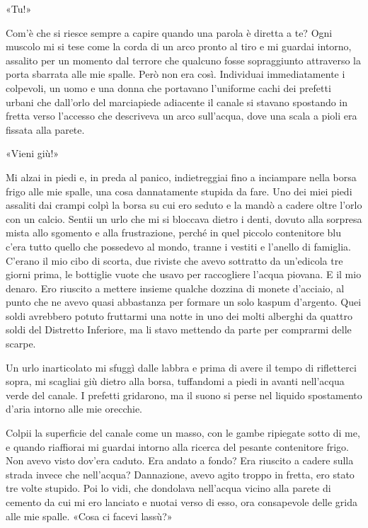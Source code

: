 «Tu!»

Com'è che si riesce sempre a capire quando una parola è diretta a te?
Ogni muscolo mi si tese come la corda di un arco pronto al tiro e mi
guardai intorno, assalito per un momento dal terrore che qualcuno fosse
sopraggiunto attraverso la porta sbarrata alle mie spalle. Però non era
così. Individuai immediatamente i colpevoli, un uomo e una donna che
portavano l'uniforme cachi dei prefetti urbani che dall'orlo del
marciapiede adiacente il canale si stavano spostando in fretta verso
l'accesso che descriveva un arco sull'acqua, dove una scala a pioli era
fissata alla parete.

«Vieni giù!»

Mi alzai in piedi e, in preda al panico, indietreggiai fino a inciampare
nella borsa frigo alle mie spalle, una cosa dannatamente stupida da
fare. Uno dei miei piedi assaliti dai crampi colpì la borsa su cui ero
seduto e la mandò a cadere oltre l'orlo con un calcio. Sentii un urlo
che mi si bloccava dietro i denti, dovuto alla sorpresa mista allo
sgomento e alla frustrazione, perché in quel piccolo contenitore blu
c'era tutto quello che possedevo al mondo, tranne i vestiti e l'anello
di famiglia. C'erano il mio cibo di scorta, due riviste che avevo
sottratto da un'edicola tre giorni prima, le bottiglie vuote che usavo
per raccogliere l'acqua piovana. E il mio denaro. Ero riuscito a mettere
insieme qualche dozzina di monete d'acciaio, al punto che ne avevo quasi
abbastanza per formare un solo kaspum d'argento. Quei soldi avrebbero
potuto fruttarmi una notte in uno dei molti alberghi da quattro soldi
del Distretto Inferiore, ma li stavo mettendo da parte per comprarmi
delle scarpe.

Un urlo inarticolato mi sfuggì dalle labbra e prima di avere il tempo di
rifletterci sopra, mi scagliai giù dietro alla borsa, tuffandomi a piedi
in avanti nell'acqua verde del canale. I prefetti gridarono, ma il suono
si perse nel liquido spostamento d'aria intorno alle mie orecchie.

Colpii la superficie del canale come un masso, con le gambe ripiegate
sotto di me, e quando riaffiorai mi guardai intorno alla ricerca del
pesante contenitore frigo. Non avevo visto dov'era caduto. Era andato a
fondo? Era riuscito a cadere sulla strada invece che nell'acqua?
Dannazione, avevo agito troppo in fretta, ero stato tre volte stupido.
Poi lo vidi, che dondolava nell'acqua vicino alla parete di cemento da
cui mi ero lanciato e nuotai verso di esso, ora consapevole delle grida
alle mie spalle. «Cosa ci facevi lassù?»

